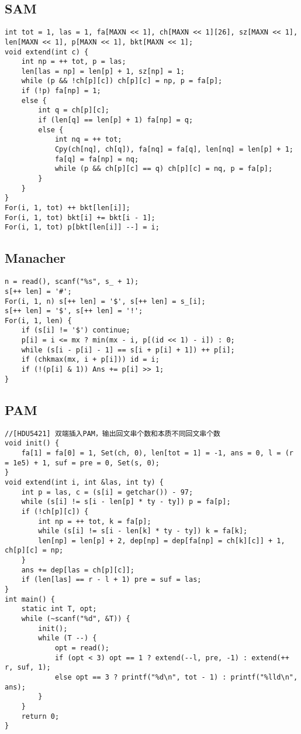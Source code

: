 \documentclass[twocolumn,a4]{article}
\begin{document}
\subsection{SAM}
\begin{lstlisting}
int tot = 1, las = 1, fa[MAXN << 1], ch[MAXN << 1][26], sz[MAXN << 1], len[MAXN << 1], p[MAXN << 1], bkt[MAXN << 1];
void extend(int c) {
	int np = ++ tot, p = las;
	len[las = np] = len[p] + 1, sz[np] = 1;
	while (p && !ch[p][c]) ch[p][c] = np, p = fa[p];
	if (!p) fa[np] = 1;
	else {
		int q = ch[p][c];
		if (len[q] == len[p] + 1) fa[np] = q;
		else {
			int nq = ++ tot;
			Cpy(ch[nq], ch[q]), fa[nq] = fa[q], len[nq] = len[p] + 1;
			fa[q] = fa[np] = nq;
			while (p && ch[p][c] == q) ch[p][c] = nq, p = fa[p];
		}
	}
}
For(i, 1, tot) ++ bkt[len[i]];
For(i, 1, tot) bkt[i] += bkt[i - 1];
For(i, 1, tot) p[bkt[len[i]] --] = i;
\end{lstlisting}

\subsection{Manacher}
\begin{lstlisting}
n = read(), scanf("%s", s_ + 1);
s[++ len] = '#';
For(i, 1, n) s[++ len] = '$', s[++ len] = s_[i];
s[++ len] = '$', s[++ len] = '!';
For(i, 1, len) {
    if (s[i] != '$') continue;
    p[i] = i <= mx ? min(mx - i, p[(id << 1) - i]) : 0;
    while (s[i - p[i] - 1] == s[i + p[i] + 1]) ++ p[i];
    if (chkmax(mx, i + p[i])) id = i;
    if (!(p[i] & 1)) Ans += p[i] >> 1;
}
\end{lstlisting}

\subsection{PAM}
\begin{lstlisting}
//[HDU5421] 双端插入PAM，输出回文串个数和本质不同回文串个数
void init() {
    fa[1] = fa[0] = 1, Set(ch, 0), len[tot = 1] = -1, ans = 0, l = (r = 1e5) + 1, suf = pre = 0, Set(s, 0);
}
void extend(int i, int &las, int ty) {
    int p = las, c = (s[i] = getchar()) - 97;
    while (s[i] != s[i - len[p] * ty - ty]) p = fa[p];
    if (!ch[p][c]) {
        int np = ++ tot, k = fa[p];
        while (s[i] != s[i - len[k] * ty - ty]) k = fa[k];
        len[np] = len[p] + 2, dep[np] = dep[fa[np] = ch[k][c]] + 1, ch[p][c] = np;
    }
    ans += dep[las = ch[p][c]];
    if (len[las] == r - l + 1) pre = suf = las;
}
int main() {
    static int T, opt;
    while (~scanf("%d", &T)) {
        init();
        while (T --) {
            opt = read();
            if (opt < 3) opt == 1 ? extend(--l, pre, -1) : extend(++ r, suf, 1);
            else opt == 3 ? printf("%d\n", tot - 1) : printf("%lld\n", ans);
        }
    }
    return 0;
}
\end{lstlisting}
\end{document}
